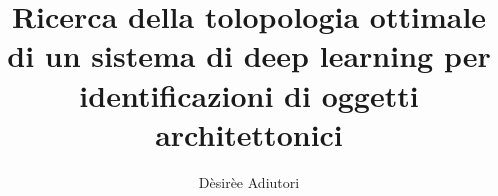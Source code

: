 \documentclass[a4paper,12pt]{report}
\begin{document}
	\title{Ricerca della tolopologia ottimale di un sistema di deep learning per identificazioni di oggetti architettonici} %
	\author{D\`{e}sir\`{e}e Adiutori}
	\date{}
	\maketitle
\end{document}
